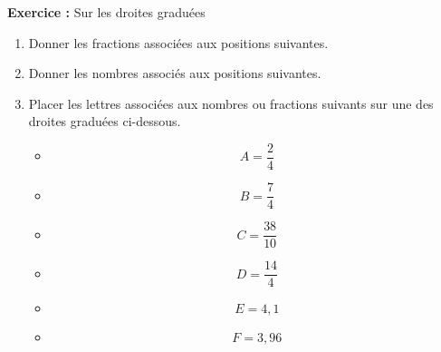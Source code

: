 \textbf{Exercice : } Sur les droites graduées

\begin{enumerate}
    \item Donner les fractions associées aux positions suivantes.



    \item Donner les nombres associés aux positions suivantes.


    \item Placer les lettres associées aux nombres ou fractions suivants sur une des droites graduées ci-dessous.
    \begin{multicols}{6}
        \begin{itemize}[label={}, leftmargin=*]
            \item $$A=\dfrac{2}{4}$$
            \item $$B=\dfrac{7}{4}$$
            \item $$C=\dfrac{38}{10}$$
            \item $$D=\dfrac{14}{4}$$
            \item $$E=4,1$$
            \item $$F=3,96$$
        \end{itemize}
    \end{multicols}
    \vspace{1em}



    \begin{figure}[H]
        \centering
    \end{figure}


    
\end{enumerate}